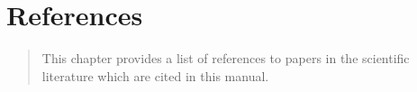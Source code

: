 \chapter{References}
\label{cha:references}

\begin{quote} 
   This chapter provides a list of references to papers in the scientific literature which are cited in this manual.
\end{quote}


